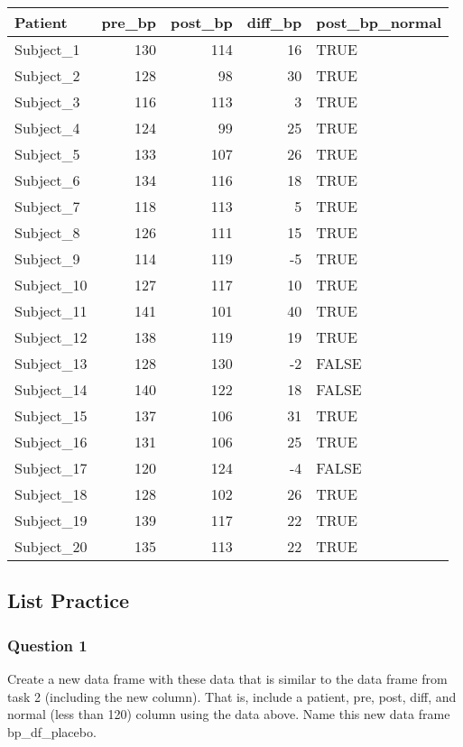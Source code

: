 \documentclass[
  letterpaper,
  DIV=11,
  numbers=noendperiod]{scrartcl}
\begin{document}
\begin{longtable}[]{@{}lrrrl@{}}
\toprule\noalign{}
Patient & pre\_bp & post\_bp & diff\_bp & post\_bp\_normal \\
\midrule\noalign{}
\endhead
\bottomrule\noalign{}
\endlastfoot
Subject\_1 & 130 & 114 & 16 & TRUE \\
Subject\_2 & 128 & 98 & 30 & TRUE \\
Subject\_3 & 116 & 113 & 3 & TRUE \\
Subject\_4 & 124 & 99 & 25 & TRUE \\
Subject\_5 & 133 & 107 & 26 & TRUE \\
Subject\_6 & 134 & 116 & 18 & TRUE \\
Subject\_7 & 118 & 113 & 5 & TRUE \\
Subject\_8 & 126 & 111 & 15 & TRUE \\
Subject\_9 & 114 & 119 & -5 & TRUE \\
Subject\_10 & 127 & 117 & 10 & TRUE \\
Subject\_11 & 141 & 101 & 40 & TRUE \\
Subject\_12 & 138 & 119 & 19 & TRUE \\
Subject\_13 & 128 & 130 & -2 & FALSE \\
Subject\_14 & 140 & 122 & 18 & FALSE \\
Subject\_15 & 137 & 106 & 31 & TRUE \\
Subject\_16 & 131 & 106 & 25 & TRUE \\
Subject\_17 & 120 & 124 & -4 & FALSE \\
Subject\_18 & 128 & 102 & 26 & TRUE \\
Subject\_19 & 139 & 117 & 22 & TRUE \\
Subject\_20 & 135 & 113 & 22 & TRUE \\
\end{longtable}

\subsection{List Practice}\label{list-practice}

\subsubsection{Question 1}\label{question-1-2}

Create a new data frame with these data that is similar to the data
frame from task 2 (including the new column). That is, include a
patient, pre, post, diff, and normal (less than 120) column using the
data above. Name this new data frame bp\_df\_placebo.
\end{document}
